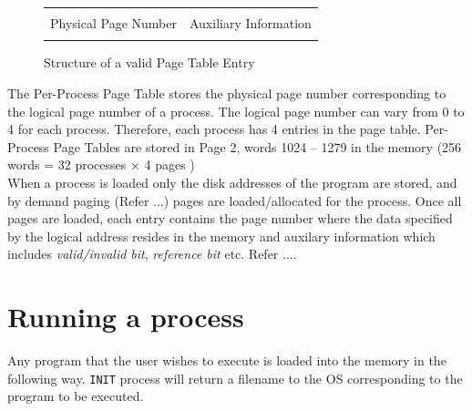 \documentclass[10pt]{report}
\begin{document}
		\begin{figure}[htp!]
		\centering
		\begin{tabular}{|c|c|}
		\hline
		  	 	& 			\\ 
		 	Physical Page Number & Auxiliary Information  \\
			 	& 			\\  \hline
		\end{tabular}
		\caption{Structure of a valid Page Table Entry}
	\end{figure}


The Per-Process Page Table stores the physical page number corresponding to the logical page number of a process. The logical page number can vary from 0 to 4 for each process.  Therefore, each process has 4 entries in the page table. Per-Process Page Tables are stored in Page 2, words 1024 -- 1279 in the memory (256 words = 32 processes $\times$ 4 pages )\\

When a process is loaded only the disk addresses of the program are stored, and by demand paging (Refer ...) pages are loaded/allocated for the process.	 Once all pages are loaded, each entry contains the page number where the data specified by the logical address resides in the memory and auxilary information which includes \textit{valid/invalid bit}, \textit{reference bit} etc. Refer ....


\section{Running a process}

Any program that the user wishes to execute is loaded into the memory in the following way. \texttt{INIT} process will return a filename to the OS corresponding to the program to be executed.
\end{document}
